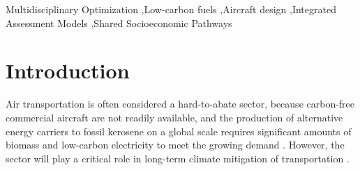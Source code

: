 \documentclass[a4paper,fleqn]{cas-dc}
\begin{document}
\begin{keywords}
Multidisciplinary Optimization \sep Low-carbon fuels \sep Aircraft design \sep Integrated Assessment Models \sep Shared Socioeconomic Pathways
\end{keywords}


\maketitle


\begin{nomenclature}
\begin{deflist}[AAAA] %
\end{deflist}
\end{nomenclature}

\section{Introduction}
\label{sec:intro}

Air transportation is often considered a hard-to-abate sector, because carbon-free commercial aircraft are not readily available, and the production of alternative energy carriers to fossil kerosene on a global scale requires significant amounts of biomass and low-carbon electricity to meet the growing demand \cite{becken_implications_2023}. However, the sector will play a critical role in long-term climate mitigation of transportation \cite{girod_global_2012}.
\end{document}
